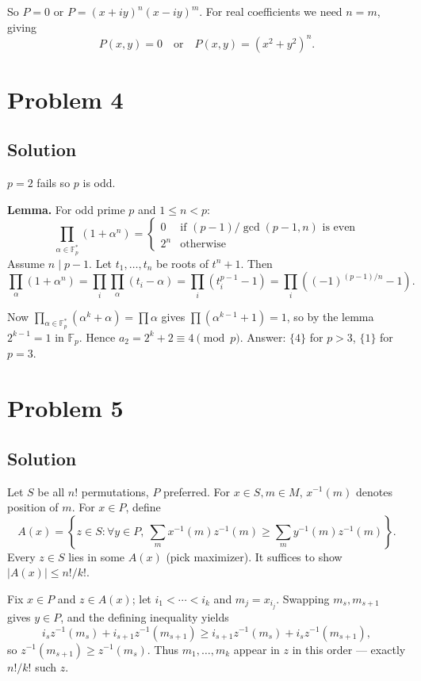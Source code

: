 \documentclass{article}
\begin{document}
So $P = 0$ or $P = (x+iy)^n(x-iy)^m$. For real coefficients we need $n = m$, giving
\[ P(x,y) = 0 \quad \text{or} \quad P(x,y) = (x^2 + y^2)^n. \]

\section*{Problem 4}
\subsection*{Solution}
$p = 2$ fails so $p$ is odd.

\textbf{Lemma.} For odd prime $p$ and $1 \leq n < p$:
\[ \prod_{\alpha \in \mathbb{F}_p^*} (1 + \alpha^n) = \begin{cases} 0 & \text{if } (p-1)/\gcd(p-1,n) \text{ is even} \\ 2^n & \text{otherwise} \end{cases} \]
Assume $n \mid p-1$. Let $t_1, \ldots, t_n$ be roots of $t^n + 1$. Then
\[ \prod_\alpha (1 + \alpha^n) = \prod_i \prod_\alpha (t_i - \alpha) = \prod_i (t_i^{p-1} - 1) = \prod_i ((-1)^{(p-1)/n} - 1). \]

Now $\prod_{\alpha \in \mathbb{F}_p^*}(\alpha^k + \alpha) = \prod \alpha$ gives $\prod(\alpha^{k-1} + 1) = 1$, so by the lemma $2^{k-1} = 1$ in $\mathbb{F}_p$. Hence $a_2 = 2^k + 2 \equiv 4 \pmod{p}$. Answer: $\{4\}$ for $p > 3$, $\{1\}$ for $p = 3$.

\section*{Problem 5}
\subsection*{Solution}
Let $S$ be all $n!$ permutations, $P$ preferred. For $x \in S, m \in M$, $x^{-1}(m)$ denotes position of $m$. For $x \in P$, define
\[ A(x) = \left\{ z \in S : \forall y \in P,\ \sum_m x^{-1}(m) z^{-1}(m) \geq \sum_m y^{-1}(m) z^{-1}(m) \right\}. \]
Every $z \in S$ lies in some $A(x)$ (pick maximizer). It suffices to show $|A(x)| \leq n!/k!$.

Fix $x \in P$ and $z \in A(x)$; let $i_1 < \cdots < i_k$ and $m_j = x_{i_j}$. Swapping $m_s, m_{s+1}$ gives $y \in P$, and the defining inequality yields
\[ i_s z^{-1}(m_s) + i_{s+1} z^{-1}(m_{s+1}) \geq i_{s+1} z^{-1}(m_s) + i_s z^{-1}(m_{s+1}), \]
so $z^{-1}(m_{s+1}) \geq z^{-1}(m_s)$. Thus $m_1, \ldots, m_k$ appear in $z$ in this order — exactly $n!/k!$ such $z$.
\end{document}
